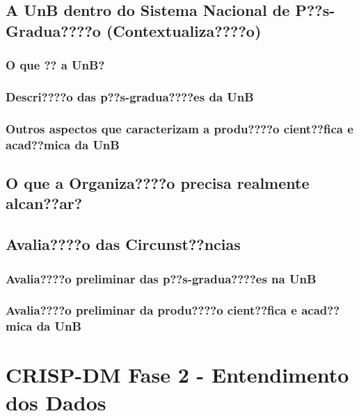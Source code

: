 \documentclass[]{article}
\begin{document}
\subsection{A UnB dentro do Sistema Nacional de P??s-Gradua????o
(Contextualiza????o)}\label{a-unb-dentro-do-sistema-nacional-de-ps-graduao-contextualizao}

\subsubsection{O que ?? a UnB?}\label{o-que-a-unb}

\subsubsection{Descri????o das p??s-gradua????es da
UnB}\label{descrio-das-ps-graduaes-da-unb}

\subsubsection{Outros aspectos que caracterizam a produ????o cient??fica
e acad??mica da
UnB}\label{outros-aspectos-que-caracterizam-a-produo-cientfica-e-acadmica-da-unb}

\subsection{O que a Organiza????o precisa realmente
alcan??ar?}\label{o-que-a-organizao-precisa-realmente-alcanar}

\subsection{Avalia????o das
Circunst??ncias}\label{avaliao-das-circunstncias}

\subsubsection{Avalia????o preliminar das p??s-gradua????es na
UnB}\label{avaliao-preliminar-das-ps-graduaes-na-unb}

\subsubsection{Avalia????o preliminar da produ????o cient??fica e
acad??mica da
UnB}\label{avaliao-preliminar-da-produo-cientfica-e-acadmica-da-unb}

\section{CRISP-DM Fase 2 - Entendimento dos
Dados}\label{crisp-dm-fase-2---entendimento-dos-dados}
\end{document}
